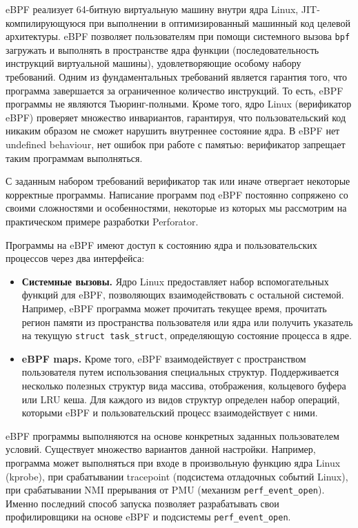 eBPF реализует 64-битную виртуальную машину внутри ядра Linux, JIT-компилирующуюся при выполнении в оптимизированный
машинный код целевой архитектуры. eBPF позволяет пользователям при помощи системного вызова \verb!bpf! загружать и выполнять в пространстве
ядра функции (последовательность инструкций виртуальной машины), удовлетворяющие особому набору требований.
Одним из фундаментальных требований является гарантия того, что программа завершается за ограниченное количество инструкций.
То есть, eBPF программы не являются Тьюринг-полными.
Кроме того, ядро Linux (верификатор eBPF) проверяет множество инвариантов, гарантируя, что пользовательский код никаким образом не сможет
нарушить внутреннее состояние ядра. В eBPF нет undefined behaviour, нет ошибок при работе с памятью: верификатор запрещает таким программам
выполняться.

С заданным набором требований верификатор так или иначе отвергает некоторые корректные программы.
Написание программ под eBPF постоянно сопряжено со своими сложностями и особенностями, некоторые из которых мы рассмотрим на практическом
примере разработки Perforator.

Программы на eBPF имеют доступ к состоянию ядра и пользовательских процессов через два интерфейса:
\begin{itemize}
    \item
        \textbf{Системные вызовы.}
        Ядро Linux предоставляет набор вспомогательных функций для eBPF,
        позволяющих взаимодействовать с остальной системой.
        Например, eBPF программа может прочитать текущее время, прочитать регион памяти из пространства пользователя или ядра
        или получить указатель на текущую \verb!struct task_struct!, определяющую состояние процесса в ядре.

    \item
        \textbf{eBPF maps.}
        Кроме того, eBPF взаимодействует с пространством пользователя путем использования специальных структур.
        Поддерживается несколько полезных структур вида массива, отображения, кольцевого буфера или LRU кеша.
        Для каждого из видов структур определен набор операций, которыми eBPF и пользовательский процесс взаимодействует с ними.
\end{itemize}

eBPF программы выполняются на основе конкретных заданных пользователем условий.
Существует множество вариантов данной настройки.
Например, программа может выполняться при входе в произвольную функцию ядра Linux (kprobe), при срабатывании tracepoint (подсистема
отладочных событий Linux), при срабатывании NMI прерывания от PMU (механизм \verb!perf_event_open!).
Именно последний способ запуска позволяет разрабатывать свои профилировщики на основе eBPF и подсистемы \verb!perf_event_open!.

